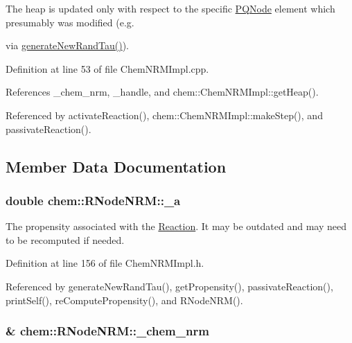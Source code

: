 The heap is updated only with respect to the specific \hyperlink{classchem_1_1PQNode}{P\-Q\-Node} element which presumably was modified (e.\-g. 

via \hyperlink{classchem_1_1RNodeNRM_a33025de761dc8d29928f8e5b1148eff1}{generate\-New\-Rand\-Tau()}). 

Definition at line 53 of file Chem\-N\-R\-M\-Impl.\-cpp.



References \-\_\-chem\-\_\-nrm, \-\_\-handle, and chem\-::\-Chem\-N\-R\-M\-Impl\-::get\-Heap().



Referenced by activate\-Reaction(), chem\-::\-Chem\-N\-R\-M\-Impl\-::make\-Step(), and passivate\-Reaction().



\subsection{Member Data Documentation}
\hypertarget{classchem_1_1RNodeNRM_ae16aa8e75649d855f4b6eae8b00ed1db}{
\subsubsection[{\-\_\-a}]{\setlength{\rightskip}{0pt plus 5cm}double {\bf chem\-::\-R\-Node\-N\-R\-M\-::\-\_\-a}}}\label{classchem_1_1RNodeNRM_ae16aa8e75649d855f4b6eae8b00ed1db}


The propensity associated with the \hyperlink{classchem_1_1Reaction}{Reaction}. It may be outdated and may need to be recomputed if needed. 



Definition at line 156 of file Chem\-N\-R\-M\-Impl.\-h.



Referenced by generate\-New\-Rand\-Tau(), get\-Propensity(), passivate\-Reaction(), print\-Self(), re\-Compute\-Propensity(), and R\-Node\-N\-R\-M().

\hypertarget{classchem_1_1RNodeNRM_acff43a1b27a778b6534bd8010904f821}{
\subsubsection[{\-\_\-chem\-\_\-nrm}]{\& {\bf chem\-::\-R\-Node\-N\-R\-M\-::\-\_\-chem\-\_\-nrm}}}\label{classchem_1_1RNodeNRM_acff43a1b27a778b6534bd8010904f821}


